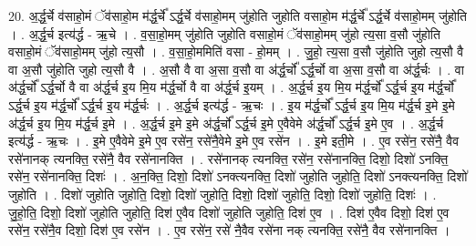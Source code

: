 \documentclass[17pt]{extarticle}
\begin{document}
20. अ॒र्द्ध॒र्चे व॑साहो॒मं ॅव॑साहो॒म म॑र्द्ध॒र्चे᳚ ऽर्द्ध॒र्चे व॑साहो॒मम् जु॑होति जुहोति वसाहो॒म म॑र्द्ध॒र्चे᳚ ऽर्द्ध॒र्चे व॑साहो॒मम् जु॑होति । . अ॒र्द्ध॒र्च इत्य॑र्द्ध - ऋ॒चे । . व॒सा॒हो॒मम् जु॑होति जुहोति वसाहो॒मं ॅव॑साहो॒मम् जु॑हो त्य॒सा व॒सौ जु॑होति वसाहो॒मं ॅव॑साहो॒मम् जु॑हो त्य॒सौ । . व॒सा॒हो॒ममिति॑ वसा - हो॒मम् । . जु॒हो॒ त्य॒सा व॒सौ जु॑होति जुहो त्य॒सौ वै वा अ॒सौ जु॑होति जुहो त्य॒सौ वै । . अ॒सौ वै वा अ॒सा व॒सौ वा अ॑र्द्ध॒र्चो᳚ ऽर्द्ध॒र्चो वा अ॒सा व॒सौ वा अ॑र्द्ध॒र्चः । . वा अ॑र्द्ध॒र्चो᳚ ऽर्द्ध॒र्चो वै वा अ॑र्द्ध॒र्च इ॒य मि॒य म॑र्द्ध॒र्चो वै वा अ॑र्द्ध॒र्च इ॒यम् । . अ॒र्द्ध॒र्च इ॒य मि॒य म॑र्द्ध॒र्चो᳚ ऽर्द्ध॒र्च इ॒य म॑र्द्ध॒र्चो᳚ ऽर्द्ध॒र्च इ॒य म॑र्द्ध॒र्चो᳚ ऽर्द्ध॒र्च इ॒य म॑र्द्ध॒र्चः । . अ॒र्द्ध॒र्च इत्य॑र्द्ध - ऋ॒चः । . इ॒य म॑र्द्ध॒र्चो᳚ ऽर्द्ध॒र्च इ॒य मि॒य म॑र्द्ध॒र्च इ॒मे इ॒मे अ॑र्द्ध॒र्च इ॒य मि॒य म॑र्द्ध॒र्च इ॒मे । . अ॒र्द्ध॒र्च इ॒मे इ॒मे अ॑र्द्ध॒र्चो᳚ ऽर्द्ध॒र्च इ॒मे ए॒वैवेमे अ॑र्द्ध॒र्चो᳚ ऽर्द्ध॒र्च इ॒मे ए॒व । . अ॒र्द्ध॒र्च इत्य॑र्द्ध - ऋ॒चः । . इ॒मे ए॒वैवेमे इ॒मे ए॒व रसे॑न॒ रसे॑नै॒वेमे इ॒मे ए॒व रसे॑न । . इ॒मे इती॒मे । . ए॒व रसे॑न॒ रसे॑नै॒ वैव रसे॑नानक् त्यनक्ति॒ रसे॑नै॒ वैव रसे॑नानक्ति । . रसे॑नानक् त्यनक्ति॒ रसे॑न॒ रसे॑नानक्ति॒ दिशो॒ दिशो॑ ऽनक्ति॒ रसे॑न॒ रसे॑नानक्ति॒ दिशः॑ । . अ॒न॒क्ति॒ दिशो॒ दिशो॑ ऽनक्त्यनक्ति॒ दिशो॑ जुहोति जुहोति॒ दिशो॑ ऽनक्त्यनक्ति॒ दिशो॑ जुहोति । . दिशो॑ जुहोति जुहोति॒ दिशो॒ दिशो॑ जुहोति॒ दिशो॒ दिशो॑ जुहोति॒ दिशो॒ दिशो॑ जुहोति॒ दिशः॑ । . जु॒हो॒ति॒ दिशो॒ दिशो॑ जुहोति जुहोति॒ दिश॑ ए॒वैव दिशो॑ जुहोति जुहोति॒ दिश॑ ए॒व । . दिश॑ ए॒वैव दिशो॒ दिश॑ ए॒व रसे॑न॒ रसे॑नै॒व दिशो॒ दिश॑ ए॒व रसे॑न । . ए॒व रसे॑न॒ रसे॑ नै॒वैव रसे॑ना नक् त्यनक्ति॒ रसे॑नै॒ वैव रसे॑नानक्ति । \newline
\end{document}
